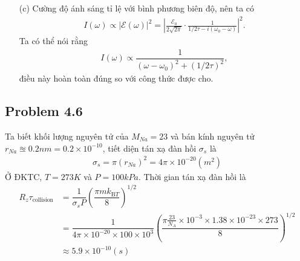 \documentclass{article}
\newcommand{\f}[2]{\dfrac{#1}{#2}}
\begin{document}
\begin{enumerate}
	      \begin{align}
		      \mathcal{E}(\omega)
		       & = \f{1}{\sqrt{2}} \int_{0}^{+\infty} \left( \f{\mathcal{E}_0}{2} e^{i(\omega_0 - \omega)t - t/2\tau} + \f{\mathcal{E}_0}{2} e^{-i(\omega_0 + \omega)t - t/2\tau} \right) dt \nonumber \\
		       & = \frac{\mathcal{E}_0}{2\sqrt{2\pi}} \left( \frac{1}{1/2\tau - i(\omega_0 - \omega)} + \frac{1}{1/2\tau + i(\omega_0 + \omega)} \right).
	      \end{align}
	      Giả sử rằng $\omega_0 \gg 1/\tau$,
	      \begin{align*}
		      \mathcal{E}(\omega) \approx \frac{\mathcal{E}_0}{2\sqrt{2\pi}} \cdot \frac{1}{1/2\tau - i(\omega_0 - \omega)}.
	      \end{align*}(ĐPCM)
	\item[(c)]  Cường độ ánh sáng tỉ lệ với bình phương biên độ, nên ta có
	      \begin{align}
		      I(\omega) \propto |\mathcal{E}(\omega)|^2 = \left|\frac{\mathcal{E}_0}{2\sqrt{2\pi}} \cdot \frac{1}{1/2\tau - i(\omega_0 - \omega)}\right|^2.
	      \end{align}
	      Ta có thể nói rằng
	      \begin{align}
		      I(\omega) \propto \f{1}{(\omega - \omega_0)^2 + (1/2\tau)^2},
	      \end{align}
	      điều này hoàn toàn đúng so với công thức được cho.
\end{enumerate}
\subsection*{Problem 4.6}
Ta biết khối lượng nguyên tử của $M_{Na} = 23$ và bán kính nguyên tử $r_{Na} \approxeq 0.2nm = 0.2\times 10^{-10}$, tiết diện tán xạ đàn hồi $\sigma_s$ là
\begin{align}
	\sigma_s = \pi (r_{Na})^2 = 4\pi \times 10^{-20} (m^2)
\end{align}
Ở ĐKTC, $T = 273 K$ và $P = 100k Pa$. Thời gian tán xạ đàn hồi là
\begin{align*}
	R_z
	\tau_{\text{collision}}
	 & = \f{1}{\sigma_s P} \left( \f{\pi m k_{\text{B} T}}{8} \right)^{1/2}                                                                                       \\
	 & = \f{1}{4\pi \times 10^{-20 } \times 100\times10^{3}} \left( \f{\pi \frac{23}{N_A} \times 10^{-3} \times 1.38\times 10^{-23} \times 273 }{8} \right)^{1/2} \\
	 & \approx 5.9 \times 10^{-10} (s)
\end{align*}
\end{document}
